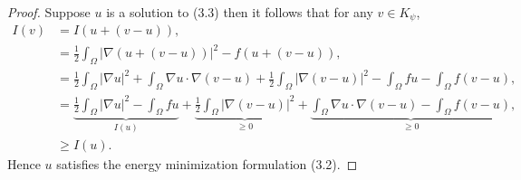 \documentclass[12 pt]{report}
\newcommand{\abs}[1]{\left| #1 \right|}
\begin{document}
\begin{proof}
  Suppose $u$ is a solution to (3.3) then it follows that for any $v \in K_\psi$, 
  \begin{align*}
    I(v) &= I(u + (v - u)),\\
    &= \frac{1}{2} \int_\Omega \abs{\nabla(u + (v - u))}^2 - f(u + (v - u)),\\
    &= \frac{1}{2} \int_\Omega \abs{\nabla u}^2+ \int_\Omega \nabla u \cdot \nabla(v - u) + \frac{1}{2} \int_\Omega \abs{\nabla(v - u)}^2 - \int_\Omega fu - \int_\Omega f(v - u),\\
    &= \underbrace{\frac{1}{2} \int_\Omega \abs{\nabla u}^2 - \int_\Omega fu}_{I(u)} + \underbrace{\frac{1}{2} \int_\Omega \abs{\nabla(v - u)}^2}_{\geq 0} + \underbrace{\int_\Omega \nabla u \cdot \nabla(v - u) - \int_\Omega f(v - u)}_{\geq 0},\\
    &\geq I(u). 
  \end{align*}
  Hence $u$ satisfies the energy minimization formulation (3.2). 


\end{proof}
\end{document}
